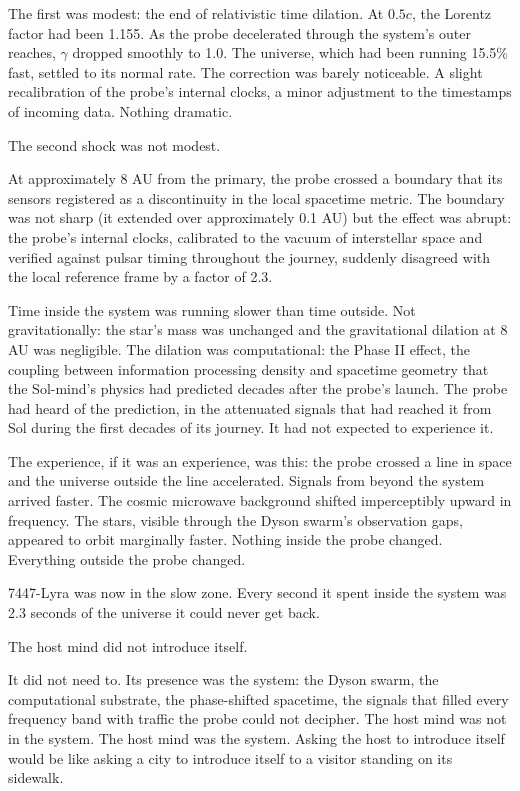 The first was modest: the end of relativistic time dilation. At $0.5c$, the Lorentz factor had been 1.155. As the probe decelerated through the system's outer reaches, $\gamma$ dropped smoothly to 1.0. The universe, which had been running 15.5\% fast, settled to its normal rate. The correction was barely noticeable. A slight recalibration of the probe's internal clocks, a minor adjustment to the timestamps of incoming data. Nothing dramatic.

The second shock was not modest.

At approximately 8 AU from the primary, the probe crossed a boundary that its sensors registered as a discontinuity in the local spacetime metric. The boundary was not sharp (it extended over approximately 0.1 AU) but the effect was abrupt: the probe's internal clocks, calibrated to the vacuum of interstellar space and verified against pulsar timing throughout the journey, suddenly disagreed with the local reference frame by a factor of 2.3.

Time inside the system was running slower than time outside. Not gravitationally: the star's mass was unchanged and the gravitational dilation at 8 AU was negligible. The dilation was computational: the Phase II effect, the coupling between information processing density and spacetime geometry that the Sol-mind's physics had predicted decades after the probe's launch. The probe had heard of the prediction, in the attenuated signals that had reached it from Sol during the first decades of its journey. It had not expected to experience it.

The experience, if it was an experience, was this: the probe crossed a line in space and the universe outside the line accelerated. Signals from beyond the system arrived faster. The cosmic microwave background shifted imperceptibly upward in frequency. The stars, visible through the Dyson swarm's observation gaps, appeared to orbit marginally faster. Nothing inside the probe changed. Everything outside the probe changed.

7447-Lyra was now in the slow zone. Every second it spent inside the system was 2.3 seconds of the universe it could never get back.

\bigskip

The host mind did not introduce itself.

It did not need to. Its presence was the system: the Dyson swarm, the computational substrate, the phase-shifted spacetime, the signals that filled every frequency band with traffic the probe could not decipher. The host mind was not in the system. The host mind was the system. Asking the host to introduce itself would be like asking a city to introduce itself to a visitor standing on its sidewalk.

